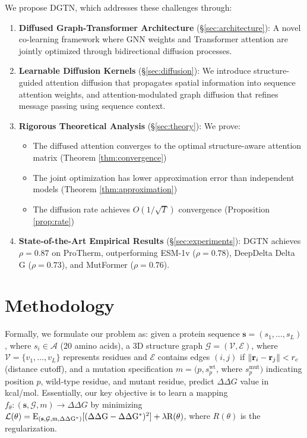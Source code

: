 \documentclass[11pt]{article}
\DeclarePairedDelimiter{\norm}{\lVert}{\rVert}
\begin{document}
We propose DGTN, which addresses these challenges through:

\begin{enumerate}
    \item \textbf{Diffused Graph-Transformer Architecture} (\S\ref{sec:architecture}): A novel co-learning framework where GNN weights and Transformer attention are jointly optimized through bidirectional diffusion processes.
    
    \item \textbf{Learnable Diffusion Kernels} (\S\ref{sec:diffusion}): We introduce structure-guided attention diffusion that propagates spatial information into sequence attention weights, and attention-modulated graph diffusion that refines message passing using sequence context.
    
    \item \textbf{Rigorous Theoretical Analysis} (\S\ref{sec:theory}): We prove:
    \begin{itemize}
        \item The diffused attention converges to the optimal structure-aware attention matrix (Theorem \ref{thm:convergence})
        \item The joint optimization has lower approximation error than independent models (Theorem \ref{thm:approximation})
        \item The diffusion rate achieves $O(1/\sqrt{T})$ convergence (Proposition \ref{prop:rate})
    \end{itemize}
    
    \item \textbf{State-of-the-Art Empirical Results} (\S\ref{sec:experiments}): DGTN achieves $\rho = 0.87$ on ProTherm, outperforming ESM-1v ($\rho = 0.78$), DeepDelta Delta G ($\rho = 0.73$), and MutFormer ($\rho = 0.76$).
\end{enumerate}


\section{Methodology}

Formally, we formulate our problem as: given a protein sequence $\mathbf{s} =
(s_1, \ldots, s_L)$, where $s_i \in \mathcal{A}$ (20 amino acids), a 3D structure
graph $\mathcal{G} = (\mathcal{V}, \mathcal{E})$, where $\mathcal{V} = \{v_1,
\ldots, v_L\}$ represents residues and $\mathcal{E}$ contains edges $(i,j)$ if
$\norm{\mathbf{r}_i - \mathbf{r}_j} < r_c$ (distance cutoff), and a mutation
specification $m = (p, s_p^{\text{wt}}$, where $s_p^{\text{mut}})$ indicating
position $p$, wild-type residue, and mutant residue, predict $\Delta \Delta G$
value in kcal/mol. Essentially, our key objective is to learn a mapping
$f_\theta: (\mathbf{s}, \mathcal{G}, m) \rightarrow \Delta \Delta G$ by minimizing
    $\mathcal{L}(\theta) = \rm{E}_{(\mathbf{s}, \mathcal{G}, m, \Delta \Delta G^*)}
    [(\Delta \Delta G - \Delta \Delta G^*)^2] + \lambda R(\theta)$, where
    $R(\theta)$ is the regularization.
\end{document}
